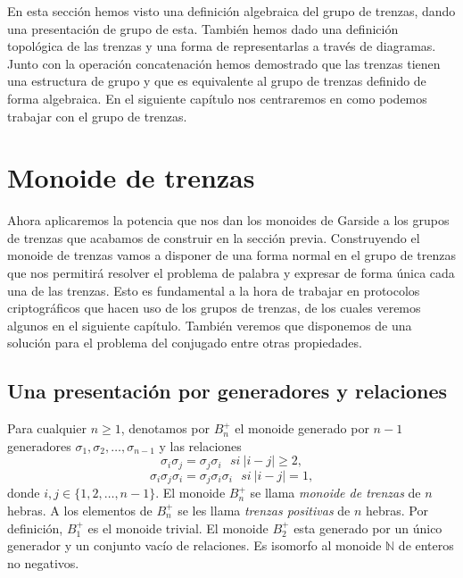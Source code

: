 \documentclass[12pt]{book}
\theoremstyle{definition}
\begin{document}
En esta sección hemos visto una definición algebraica del grupo de trenzas, dando una presentación de grupo de esta. También hemos dado una definición topológica de las trenzas y una forma de representarlas a través de diagramas. Junto con la operación concatenación hemos demostrado que las trenzas tienen una estructura de grupo y que es equivalente al grupo de trenzas definido de forma algebraica. En el siguiente capítulo nos centraremos en como podemos trabajar con el grupo de trenzas.



















\chapter{Monoide de trenzas}

Ahora aplicaremos la potencia que nos dan los monoides de Garside a los grupos de trenzas que acabamos de construir en la sección previa. Construyendo el monoide de trenzas vamos a disponer de una forma normal en el grupo de trenzas que nos permitirá resolver el problema de palabra y expresar de forma única cada una de las trenzas. Esto es fundamental a la hora de trabajar en protocolos criptográficos que hacen uso de los grupos de trenzas, de los cuales veremos algunos en el siguiente capítulo. También veremos que disponemos de una solución para el problema del conjugado entre otras propiedades.
\section{Una presentación por generadores y relaciones}

Para cualquier $n\geq 1$, denotamos por $B_n^+$ el monoide generado por $n-1$ generadores $\sigma_1,\sigma_2,\ldots,\sigma_{n-1}$ y las relaciones
$$\sigma_i\sigma_j=\sigma_j\sigma_i\ \ \ si\ |i-j|\geq 2,$$
$$\sigma_i\sigma_j\sigma_i=\sigma_j\sigma_i\sigma_i\ \ \ si\ |i-j|= 1,$$
donde $i,j\in\{1,2,\ldots,n-1\}$. El monoide $B_n^+$ se llama \textit{monoide de trenzas} de $n$ hebras. A los elementos de $B_n^+$ se les llama \textit{trenzas positivas} de $n$ hebras. Por definición, $B_1^+$ es el monoide trivial. El monoide $B_2^+$ esta generado por un único generador y un conjunto vacío de relaciones. Es isomorfo al monoide $\mathbb{N}$ de enteros no negativos.
\end{document}
